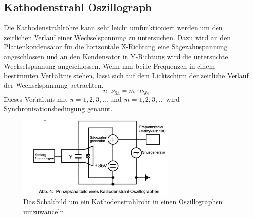 \subsection{Kathodenstrahl Oszillograph}
Die Kathodenstrahlröhre kann sehr leicht umfunktioniert werden um den zeitlichen Verlauf einer Wechselspannung zu untersuchen.
Dazu wird an den Plattenkondensator für die horizontale X-Richtung eine Sägezahnspannung angeschlossen und an den Kondensator in Y-Richtung wird die untersuchte Wechselspannung angeschlossen.
Wenn nun beide Frequenzen in einem bestimmten Verhältnis stehen, lässt sich auf dem Lichtschirm der zeitliche Verlauf der Wechselspannung betrachten.
\begin{equation}
    n\cdot \nu_{\text{Sä}} = m\cdot \nu_{\text{We}}
\end{equation}
Dieses Verhältnis mit $n = 1,2,3,...$ und $m = 1,2,3,...$ wird Synchronisationsbedingung genannt.
\begin{figure}
    \centering
    \includegraphics[width=0.7\textwidth]{bilder/Prinzipschaltbild.png}
    \caption{Das Schaltbild um ein Kathodenstrahlrohr in einen Oszillographen umzuwandeln}
\end{figure}
